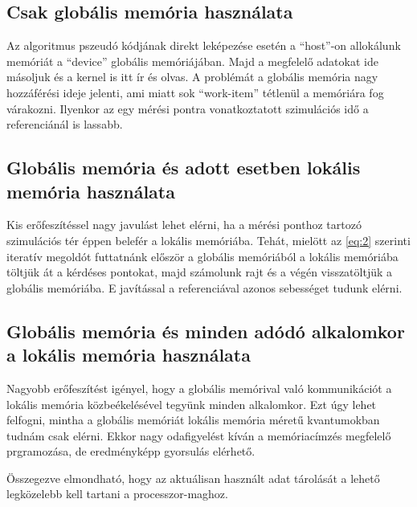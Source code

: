 \subsection{Csak globális memória használata}
	Az algoritmus pszeudó kódjának direkt leképezése esetén a ``host''-on
	allokálunk memóriát a ``device'' globális memóriájában.
	Majd a megfelelő adatokat ide másoljuk és a kernel is itt ír és olvas.
	A problémát a globális memória nagy hozzáférési ideje jelenti, ami miatt sok
	``work-item'' tétlenül a memóriára fog várakozni.
	Ilyenkor az egy mérési pontra vonatkoztatott szimulációs idő a
	referenciánál is lassabb.
\subsection{Globális memória és adott esetben lokális memória használata}
	Kis erőfeszítéssel nagy javulást lehet elérni, ha a mérési ponthoz tartozó
	szimulációs tér éppen belefér a lokális memóriába.
	Tehát, mielött az \ref{eq:2} szerinti iteratív megoldót futtatnánk először a
	globális memóriából a lokális memóriába töltjük át a kérdéses pontokat, majd
	számolunk rajt és a végén visszatöltjük a globális memóriába.
	E javítással a referenciával azonos sebességet tudunk elérni.
\subsection{Globális memória és minden adódó alkalomkor a lokális memória használata}
	Nagyobb erőfeszítést igényel, hogy a globális memórival való kommunikációt a
	lokális memória közbeékelésével tegyünk minden alkalomkor.
	Ezt úgy lehet felfogni, mintha a globális memóriát lokális memória méretű
	kvantumokban tudnám csak elérni.
	Ekkor nagy odafigyelést kíván a memóriacímzés megfelelő prgramozása, de
	eredményképp gyorsulás elérhető.
	
	\noindent
	\begin{center}
	Összegezve elmondható, hogy az aktuálisan használt adat tárolását a lehető
	legközelebb kell tartani a processzor-maghoz.
	\end{center}






